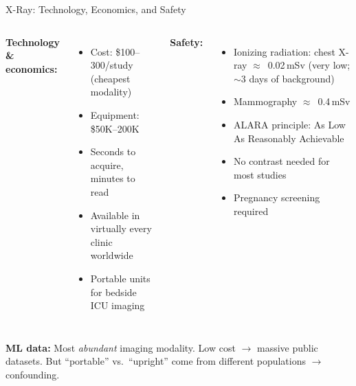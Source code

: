 \documentclass[aspectratio=169,10pt]{beamer}
\begin{document}
\begin{frame}{X-Ray: Technology, Economics, and Safety}
\begin{columns}[T]
\textbf{Technology \& economics:}
\begin{itemize}
    \item Cost: \$100--300/study (cheapest modality)
    \item Equipment: \$50K--200K
    \item Seconds to acquire, minutes to read
    \item Available in virtually every clinic worldwide
    \item Portable units for bedside ICU imaging
\end{itemize}

\textbf{Safety:}
\begin{itemize}
    \item Ionizing radiation: chest X-ray $\approx$~0.02\,mSv (very low; $\sim$3 days of background)
    \item Mammography $\approx$~0.4\,mSv
    \item ALARA principle: As Low As Reasonably Achievable
    \item No contrast needed for most studies
    \item Pregnancy screening required
\end{itemize}
\end{columns}

\vspace{0.3em}
\pause
\textbf{ML data:} Most \emph{abundant} imaging modality. Low cost $\to$ massive public datasets. But ``portable'' vs.\ ``upright'' come from different populations $\to$ confounding.
\end{frame}
\end{document}
